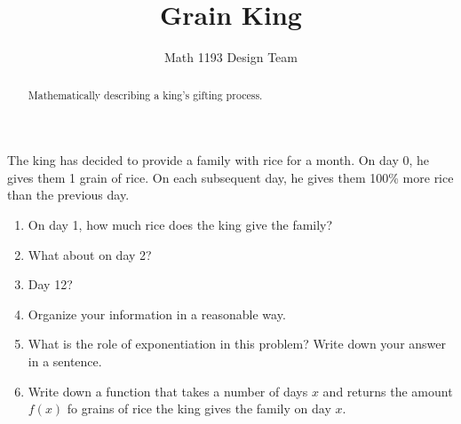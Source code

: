 \documentclass[noauthor]{ximera}
\title{Grain King}
\author{Math 1193 Design Team}
\begin{document}
\begin{abstract}
    Mathematically describing a king's gifting process.
\end{abstract}
\maketitle

The king has decided to provide a family with rice for a month. 
On day 0, he gives them 1 grain of rice. On each subsequent day, 
he gives them 100\% more rice than the previous day. 

\begin{enumerate}
    \item On day 1, how much rice does the king give the family?
    \item What about on day 2?
    \item Day 12?
    \item Organize your information in a reasonable way.
    \item What is the role of exponentiation in this problem? Write down
    your answer in a sentence.
    \item Write down a function that takes a number of days \(x\)
    and returns the amount \(f(x)\) fo grains of rice the king gives the
    family on day \(x\).
\end{enumerate}
\end{document}
